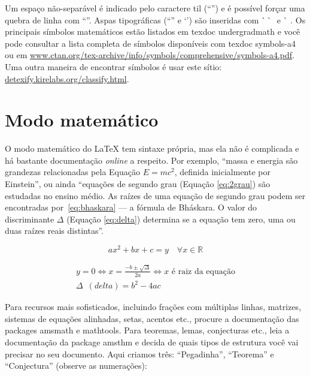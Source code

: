 Um espaço não-separável é indicado pelo caractere til
(``\cmd{\textasciitilde{}}'') e é possível forçar uma quebra de linha com
``\cmd{\sla\sla{}}''. Aspas tipográficas (``\;'' e `\;') são inseridas
com \`\space\,\`\space\space\,\textquotesingle\,\textquotesingle{} e
\`\space\,\,\textquotesingle. Os principais símbolos matemáticos estão
listados em \textsf{texdoc undergradmath} e você pode consultar a lista
completa de símbolos disponíveis com \textsf{texdoc symbols-a4} ou em
\url{www.ctan.org/tex-archive/info/symbols/comprehensive/symbols-a4.pdf}.
Uma outra maneira de encontrar símbolos é usar este sítio:
\url{detexify.kirelabs.org/classify.html}.

\section{Modo matemático}

O modo matemático do \LaTeX{} tem sintaxe própria, mas ela não é complicada e
há bastante documentação \emph{online} a respeito. Por exemplo, ``massa e
energia são grandezas relacionadas pela Equação $E=mc^2$, definida inicialmente
por Einstein'', ou ainda ``equações de segundo grau (Equação \ref{eq:2grau})
são estudadas no ensino médio. As raízes de uma equação de segundo grau podem
ser encontradas por~\eqref{eq:bhaskara} --- a fórmula de Bháskara.
O valor do discriminante $\Delta$ (Equação \ref{eq:delta}) determina se a
equação tem zero, uma ou duas raízes reais distintas''.

\begin{equation}
  \label{eq:2grau}
  ax^2+bx+c=y \quad \forall x \in \mathbb{R}
\end{equation}

\begin{gather}
  \label{eq:bhaskara}
    y=0 \Leftrightarrow x=\frac{-b \pm \sqrt{\Delta}}{2a}
    \Leftrightarrow x \text{ é raiz da equação}\\
  \label{eq:delta}
    \Delta\enspace(\mathit{delta}) = b^2-4ac
\end{gather}

Para recursos mais sofisticados, incluindo frações com múltiplas linhas,
matrizes, sistemas de equações alinhadas, setas, acentos etc., procure
a documentação das packages \textsf{amsmath} e \textsf{mathtools}. Para
teoremas, lemas, conjecturas etc., leia a documentação da package
\textsf{amsthm} e decida de quais tipos de estrutura você vai precisar
no seu documento. Aqui criamos três: ``Pegadinha'', ``Teorema'' e
``Conjectura'' (observe as numerações):

